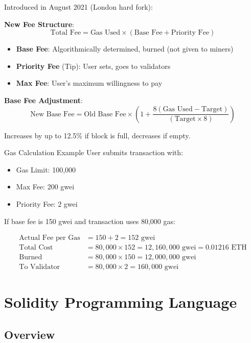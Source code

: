 \documentclass[11pt,a4paper]{article}
\begin{document}
Introduced in August 2021 (London hard fork):

\textbf{New Fee Structure}:
\[
\text{Total Fee} = \text{Gas Used} \times (\text{Base Fee} + \text{Priority Fee})
\]

\begin{itemize}
  \item \textbf{Base Fee}: Algorithmically determined, burned (not given to miners)
  \item \textbf{Priority Fee} (Tip): User sets, goes to validators
  \item \textbf{Max Fee}: User's maximum willingness to pay
\end{itemize}

\textbf{Base Fee Adjustment}:
\[
\text{New Base Fee} = \text{Old Base Fee} \times \left(1 + \frac{8(\text{Gas Used} - \text{Target})}{(\text{Target} \times 8)}\right)
\]

Increases by up to 12.5\% if block is full, decreases if empty.

\begin{examplebox}{Gas Calculation Example}
User submits transaction with:
\begin{itemize}
  \item Gas Limit: 100,000
  \item Max Fee: 200 gwei
  \item Priority Fee: 2 gwei
\end{itemize}

If base fee is 150 gwei and transaction uses 80,000 gas:

\begin{align*}
\text{Actual Fee per Gas} &= 150 + 2 = 152 \text{ gwei} \\
\text{Total Cost} &= 80,000 \times 152 = 12,160,000 \text{ gwei} = 0.01216 \text{ ETH} \\
\text{Burned} &= 80,000 \times 150 = 12,000,000 \text{ gwei} \\
\text{To Validator} &= 80,000 \times 2 = 160,000 \text{ gwei}
\end{align*}
\end{examplebox}

\section{Solidity Programming Language}

\subsection{Overview}
\end{document}
